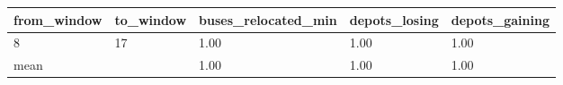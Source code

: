 \begin{tabular}{lllll}
\toprule
from\_window & to\_window & buses\_relocated\_min & depots\_losing & depots\_gaining \\
\midrule
8 & 17 & 1.00 & 1.00 & 1.00 \\
mean &  & 1.00 & 1.00 & 1.00 \\
\bottomrule
\end{tabular}
